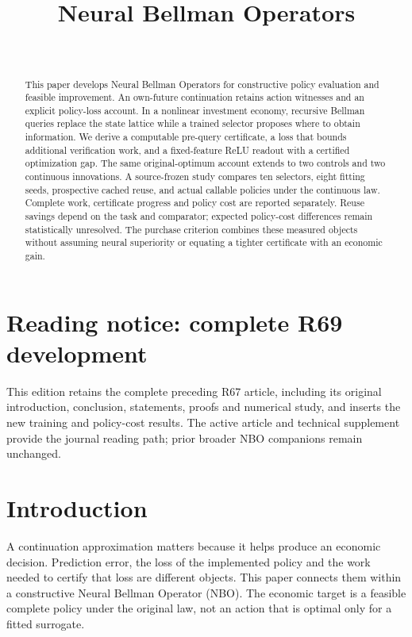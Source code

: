 \documentclass[ecta,nameyear,draft]{econsocart}
\begin{document}
\begin{frontmatter}
\title{Neural Bellman Operators}
\begin{aug}
\author[id=au1,addressref={add1}]{~}
\address[id=add1]{Peking University}
\end{aug}
\begin{abstract}
This paper develops Neural Bellman Operators for constructive policy evaluation and feasible improvement. An own-future continuation retains action witnesses and an explicit policy-loss account. In a nonlinear investment economy, recursive Bellman queries replace the state lattice while a trained selector proposes where to obtain information. We derive a computable pre-query certificate, a loss that bounds additional verification work, and a fixed-feature ReLU readout with a certified optimization gap. The same original-optimum account extends to two controls and two continuous innovations. A source-frozen study compares ten selectors, eight fitting seeds, prospective cached reuse, and actual callable policies under the continuous law. Complete work, certificate progress and policy cost are reported separately. Reuse savings depend on the task and comparator; expected policy-cost differences remain statistically unresolved. The purchase criterion combines these measured objects without assuming neural superiority or equating a tighter certificate with an economic gain.
\end{abstract}
\begin{keyword}
\end{keyword}
\end{frontmatter}
\section*{Reading notice: complete R69 development} This edition retains the complete preceding R67 article, including its original introduction, conclusion, statements, proofs and numerical study, and inserts the new training and policy-cost results. The active article and technical supplement provide the journal reading path; prior broader NBO companions remain unchanged.
\section{Introduction}\label{sec:introduction65}
A continuation approximation matters because it helps produce an economic decision. Prediction error, the loss of the implemented policy and the work needed to certify that loss are different objects. This paper connects them within a constructive Neural Bellman Operator (NBO). The economic target is a feasible complete policy under the original law, not an action that is optimal only for a fitted surrogate.
\end{document}
